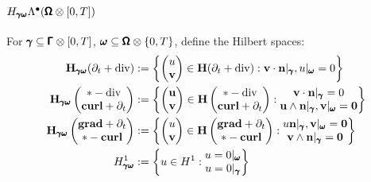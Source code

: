         \subsection*{$H_{\pmb{\mathsf{\gamma}}\pmb{\mathsf{\omega}}}\Lambda^{\bullet}(\pmb{\mathsf{\Omega}}\otimes[0, T])$}
            For $\pmb{\mathsf{\gamma}}  \subseteq  \pmb{\mathsf{\Gamma}}\otimes[0, T]$, $\pmb{\mathsf{\omega}}  \subseteq  \pmb{\mathsf{\Omega}}\otimes\{0, T\}$, define the Hilbert spaces:
            \begin{align}
                \mathbf{H}_{\pmb{\mathsf{\gamma}}\pmb{\mathsf{\omega}}}(\partial_{t} + \mathrm{div})  &:=  \left\{\begin{pmatrix} u \\ \mathbf{v} \end{pmatrix} \in \mathbf{H}(\partial_{t} + \mathrm{div}) : \mathbf{v}\cdot\mathbf{n}|_{\pmb{\mathsf{\gamma}}}, u|_{\pmb{\mathsf{\omega}}} = 0\right\}  \\
                \mathbf{H}_{\pmb{\mathsf{\gamma}}\pmb{\mathsf{\omega}}}\left(\begin{matrix} * - \mathrm{div} \\ \mathbf{curl} + \partial_{t} \end{matrix}\right)  &:=  \left\{\begin{pmatrix} \mathbf{u} \\ \mathbf{v} \end{pmatrix} \in \mathbf{H}\left(\begin{matrix} * - \mathrm{div} \\ \mathbf{curl} + \partial_{t} \end{matrix}\right) : \begin{matrix} \mathbf{v}\cdot\mathbf{n}|_{\pmb{\mathsf{\gamma}}} = 0 \\ \mathbf{u}\wedge\mathbf{n}|_{\pmb{\mathsf{\gamma}}}, \mathbf{v}|_{\pmb{\mathsf{\omega}}} = \mathbf{0} \end{matrix}\right\}  \\
                \mathbf{H}_{\pmb{\mathsf{\gamma}}\pmb{\mathsf{\omega}}}\left(\begin{matrix} \mathbf{grad} + \partial_{t} \\ * - \mathbf{curl} \end{matrix}\right)  &:=  \left\{\begin{pmatrix} u \\ \mathbf{v} \end{pmatrix} \in \mathbf{H}\left(\begin{matrix} \mathbf{grad} + \partial_{t} \\ * - \mathbf{curl} \end{matrix}\right) : \begin{matrix} u\mathbf{n}|_{\pmb{\mathsf{\gamma}}}, \mathbf{v}|_{\pmb{\mathsf{\omega}}} = \mathbf{0} \\ \mathbf{v}\wedge\mathbf{n}|_{\pmb{\mathsf{\gamma}}} = \mathbf{0} \end{matrix}\right\}  \\
                H^{1}_{\pmb{\mathsf{\gamma}}\pmb{\mathsf{\omega}}}  &:=  \left\{u \in H^{1} : \begin{matrix} u = 0|_{\pmb{\mathsf{\omega}}} \\ u = 0|_{\pmb{\mathsf{\gamma}}} \end{matrix}\right\}
            \end{align}
